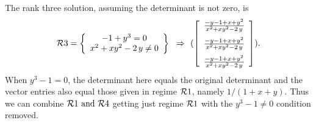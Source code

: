
%
%
%
%
%
The rank three solution, assuming the determinant is not zero, is 
\[\RR3 = 
\breg
-1+{y}^{3}=0\\{x}^{2}+x{y}^{2}-2\,y\neq 0\ereg \implies
(
\left [\begin {array}{c} 
{\frac {-y-1+x+{y}^{2}}{{x}^{2}+x{y}^{2}-2\,y}}\\\noalign{\medskip}
{\frac {-y-1+x+{y}^{2}}{{x}^{2}+x{y}^{2}-2\,y}}\\\noalign{\medskip}
{\frac {-y-1+x+{y}^{2}}{{x}^{2}+x{y}^{2}-2\,y}}
\end {array}\right ]
).\]
When $y^3 -1 = 0$, the determinant here equals the original determinant and the vector
entries also equal those given in regime ${\cal R}1$, namely $1/(1+x+y)$.  Thus we can
combine ${\cal R}1 ~\mbox{and}~ {\cal R}4$ getting just regime ${\cal R}1$ with the $y^3 -1 \neq 0$ condition removed. 

